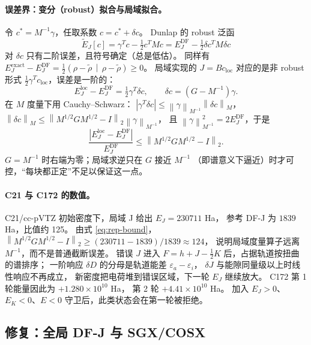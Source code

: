 \documentclass[UTF8,fontset=fandol,11pt,a4paper]{ctexart}
\numberwithin{equation}{section}
\newcommand{\norm}[1]{\left\lVert #1\right\rVert}
\newcommand{\inner}[2]{\left(#1\,\middle|\,#2\right)}
\begin{document}
\paragraph{误差界：变分（robust）拟合与局域拟合。}
令 \(c^\ast=M^{-1}\gamma\)，任取系数 \(c=c^\ast+\delta c\)。
Dunlap 的 robust 泛函
\begin{equation}
\widetilde E_J[c]=\gamma^Tc-\tfrac12c^TMc
=E_J^{\mathrm{DF}}-\tfrac12\delta c^TM\delta c
\label{eq:rep-robust}
\end{equation}
对 \(\delta c\) 只有二阶误差，且符号确定（总是低估）。
同样有 \(E_J^{\mathrm{exact}}-E_J^{\mathrm{DF}}
=\frac12\inner{\rho-\widetilde\rho}{\rho-\widetilde\rho}\geq0\)。
局域实现的 \(J=Bc_{\mathrm{loc}}\) 对应的是非 robust 形式
\(\frac12\gamma^Tc_{\mathrm{loc}}\)，误差是一阶的：
\begin{equation}
E_J^{\mathrm{loc}}-E_J^{\mathrm{DF}}=\tfrac12\gamma^T\delta c,
\qquad \delta c=(G-M^{-1})\gamma .
\end{equation}
在 \(M\) 度量下用 Cauchy--Schwarz：
\(|\gamma^T\delta c|\leq\norm{\gamma}_{M^{-1}}\norm{\delta c}_M\)，
\(\norm{\delta c}_M\leq\norm{M^{1/2}GM^{1/2}-I}_2\norm{\gamma}_{M^{-1}}\)，
且 \(\norm{\gamma}_{M^{-1}}^2=2E_J^{\mathrm{DF}}\)，于是
\begin{equation}
\frac{|E_J^{\mathrm{loc}}-E_J^{\mathrm{DF}}|}{E_J^{\mathrm{DF}}}
\leq\norm{M^{1/2}GM^{1/2}-I}_2 .
\label{eq:rep-bound}
\end{equation}
\(G=M^{-1}\) 时右端为零；局域求逆只在 \(G\) 接近 \(M^{-1}\)
（即谱意义下逼近）时才可控，“每块都正定”不足以保证这一点。

\paragraph{C21 与 C172 的数值。}
C21/cc-pVTZ 初始密度下，局域 J 给出 \(E_J=230711\) Ha，
参考 DF-J 为 \(1839\) Ha，比值约 125。
由式 \eqref{eq:rep-bound}，
\(\norm{M^{1/2}GM^{1/2}-I}_2\geq(230711-1839)/1839\approx124\)，
说明局域度量算子远离 \(M^{-1}\)，而不是普通截断误差。
错误 \(J\) 进入 \(F=h+J-\frac12K\) 后，占据轨道按扭曲的谱排序；
一阶响应 \(\delta D\) 的分母是轨道能差 \(\varepsilon_a-\varepsilon_i\)，
\(\delta J\) 与能隙同量级以上时线性响应不再成立，
新密度把电荷堆到错误区域，下一轮 \(E_J\) 继续放大。
C172 第 1 轮能量因此为 \(+1.280\times10^{10}\) Ha，
第 2 轮 \(+4.41\times10^{10}\) Ha。
加入 \(E_J>0\)、\(E_K<0\)、\(E<0\) 守卫后，此类状态会在第一轮被拒绝。

\subsection{修复：全局 DF-J 与 SGX/COSX}
\label{sec:repair-fix}
\end{document}
